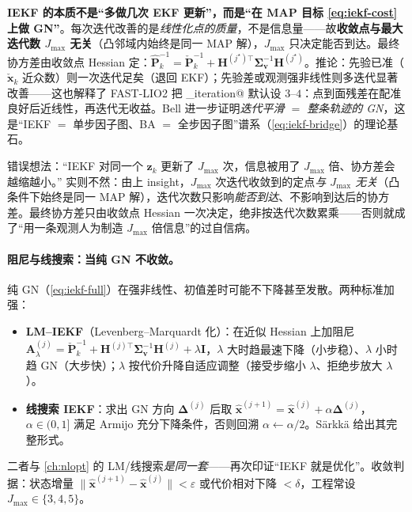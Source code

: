 \begin{insight}
\textbf{IEKF 的本质不是“多做几次 EKF 更新”，而是“在 MAP 目标 \cref{eq:iekf-cost} 上做 GN”}。每次迭代改善的是\emph{线性化点的质量}，不是信息量——故\textbf{收敛点与最大迭代数 $J_{\max}$ 无关}（凸邻域内始终是同一 MAP 解），$J_{\max}$ 只决定能否到达。最终协方差由收敛点 Hessian 定：$\hat{\mathbf{P}}_k^{-1}=\check{\mathbf{P}}_k^{-1}+\mathbf{H}^{(j^\star)\top}\boldsymbol{\Sigma}_{\mathbf{v}}^{-1}\mathbf{H}^{(j^\star)}$。推论：先验已准（$\check{\mathbf{x}}_k$ 近众数）则一次迭代足矣（退回 EKF）；先验差或观测强非线性则多迭代显著改善——这也解释了 FAST-LIO2 把 \verb@max_iteration@ 默认设 $3$--$4$：点到面残差在配准良好后近线性，再迭代无收益\cite{xu2022fastlio2}。Bell 进一步证明\emph{迭代平滑 $=$ 整条轨迹的 GN}\cite{bell1993iterated}，这是“IEKF $=$ 单步因子图、BA $=$ 全步因子图”谱系（\cref{eq:iekf-bridge}）的理论基石。
\end{insight}

\begin{pitfall}
错误想法：“IEKF 对同一个 $\mathbf{z}_k$ 更新了 $J_{\max}$ 次，信息被用了 $J_{\max}$ 倍、协方差会越缩越小。” 实则不然：由上 insight，$J_{\max}$ 次迭代收敛到的定点\emph{与 $J_{\max}$ 无关}（凸条件下始终是同一 MAP 解），迭代次数只影响\emph{能否到达}、不影响到达后的协方差。最终协方差只由收敛点 Hessian 一次决定，绝非按迭代次数累乘——否则就成了“用一条观测人为制造 $J_{\max}$ 倍信息”的过自信病。
\end{pitfall}

\paragraph{阻尼与线搜索：当纯 GN 不收敛。}
纯 GN（\cref{eq:iekf-full}）在强非线性、初值差时可能不下降甚至发散。两种标准加强\cite{barfoot2024state}：
\begin{itemize}
  \item \textbf{LM--IEKF}（Levenberg--Marquardt 化）：在近似 Hessian 上加阻尼 $\mathbf{A}_\lambda^{(j)}=\check{\mathbf{P}}_k^{-1}+\mathbf{H}^{(j)\top}\boldsymbol{\Sigma}_{\mathbf{v}}^{-1}\mathbf{H}^{(j)}+\lambda\mathbf{I}$，$\lambda$ 大时趋最速下降（小步稳）、$\lambda$ 小时趋 GN（大步快）；$\lambda$ 按代价升降自适应调整（接受步缩小 $\lambda$、拒绝步放大 $\lambda$）。
  \item \textbf{线搜索 IEKF}：求出 GN 方向 $\boldsymbol{\Delta}^{(j)}$ 后取 $\hat{\mathbf{x}}^{(j+1)}=\hat{\mathbf{x}}^{(j)}+\alpha\boldsymbol{\Delta}^{(j)}$，$\alpha\in(0,1]$ 满足 Armijo 充分下降条件，否则回溯 $\alpha\leftarrow\alpha/2$。Särkkä\cite{sarkka2013bayesian} 给出其完整形式。
\end{itemize}
二者与 \cref{ch:nlopt} 的 LM/线搜索\emph{是同一套}——再次印证“IEKF 就是优化”。收敛判据：状态增量 $\|\hat{\mathbf{x}}^{(j+1)}-\hat{\mathbf{x}}^{(j)}\|<\varepsilon$ 或代价相对下降 $<\delta$，工程常设 $J_{\max}\in\{3,4,5\}$。

